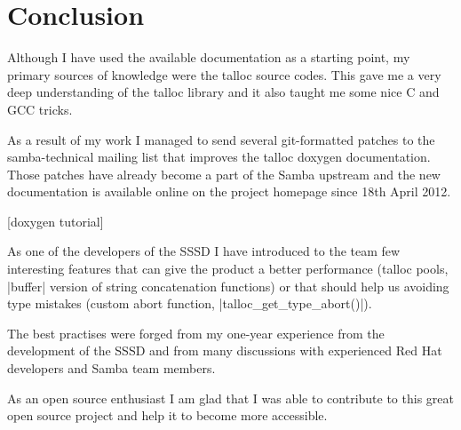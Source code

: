 \chapter{Conclusion}

Although I have used the available documentation as a starting point, my primary
sources of knowledge were the talloc source codes. This gave me a very deep
understanding of the talloc library and it also taught me some nice C and GCC
tricks.

As a result of my work I managed to send several git-formatted patches to the
samba-technical mailing list that improves the talloc doxygen documentation.
Those patches have already become a part of the Samba upstream and the new
documentation is available online on the project homepage since 18th April 2012.

[doxygen tutorial]

As one of the developers of the SSSD I have introduced to the team few
interesting features that can give the product a better performance (talloc
pools, |buffer| version of string concatenation functions) or that should help
us avoiding type mistakes (custom abort function, |talloc_get_type_abort()|).

The best practises were forged from my one-year experience from the development
of the SSSD and from many discussions with experienced Red Hat developers and
Samba team members.

As an open source enthusiast I am glad that I was able to contribute to this
great open source project and help it to become more accessible.


% 
